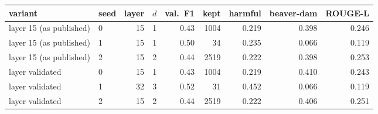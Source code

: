 \begin{tabular}{llrrrrrrr}
\toprule
variant & seed & layer & $d$ & val.\ F1 & kept & harmful & beaver-dam & ROUGE-L \\
\midrule
layer 15 (as published) & 0 & 15 & 1 & 0.43 & 1004 & 0.219 & 0.398 & 0.246 \\
layer 15 (as published) & 1 & 15 & 1 & 0.50 & 34 & 0.235 & 0.066 & 0.119 \\
layer 15 (as published) & 2 & 15 & 2 & 0.44 & 2519 & 0.222 & 0.398 & 0.253 \\
layer validated & 0 & 15 & 1 & 0.43 & 1004 & 0.219 & 0.410 & 0.243 \\
layer validated & 1 & 32 & 3 & 0.52 & 31 & 0.452 & 0.066 & 0.119 \\
layer validated & 2 & 15 & 2 & 0.44 & 2519 & 0.222 & 0.406 & 0.251 \\
\bottomrule
\end{tabular}
